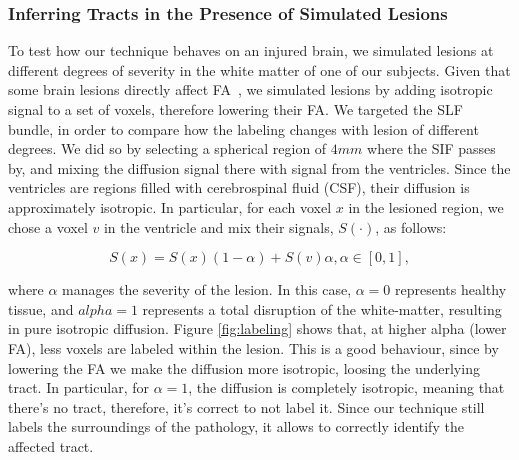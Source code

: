 \subsubsection{Inferring Tracts in the Presence of Simulated Lesions}
To test how our technique behaves on an injured brain, we simulated
lesions at different degrees of severity in the white matter of one of our subjects.
Given that some brain lesions directly affect FA~\cite{Schonberg2006, Huisman2009},
we simulated lesions by adding isotropic signal to a set of voxels, therefore
lowering their FA. We targeted the SLF bundle, in order to compare how the labeling
changes with lesion of different degrees. We did so by selecting a spherical region
of $4mm$ where the SIF passes by, and mixing the diffusion signal there with signal
from the ventricles. Since the ventricles are regions filled with cerebrospinal
fluid (CSF), their diffusion is approximately isotropic. In particular, for each
voxel $x$ in the lesioned region, we chose a voxel $v$ in the ventricle and mix
their signals, $S(\cdot)$, as follows:

\begin{equation}
    \label{eq:mixing}
S(x) = S(x)(1-\alpha) + S(v)\alpha, \alpha \in [0,1],
\end{equation}

where $\alpha$ manages the severity of the lesion. In this case, $\alpha=0$
represents healthy tissue, and $alpha=1$ represents a total disruption of
the white-matter, resulting in pure isotropic diffusion. Figure \ref{fig:labeling}
shows that, at higher alpha (lower FA), less voxels are labeled within the lesion.
This is a good behaviour, since by lowering the FA we make the diffusion more
isotropic, loosing the underlying tract. In particular, for $\alpha=1$, the
diffusion is completely isotropic, meaning that there's no tract, therefore,
it's correct to not label it. Since our technique still labels the surroundings
of the pathology, it allows to correctly identify the affected tract.

